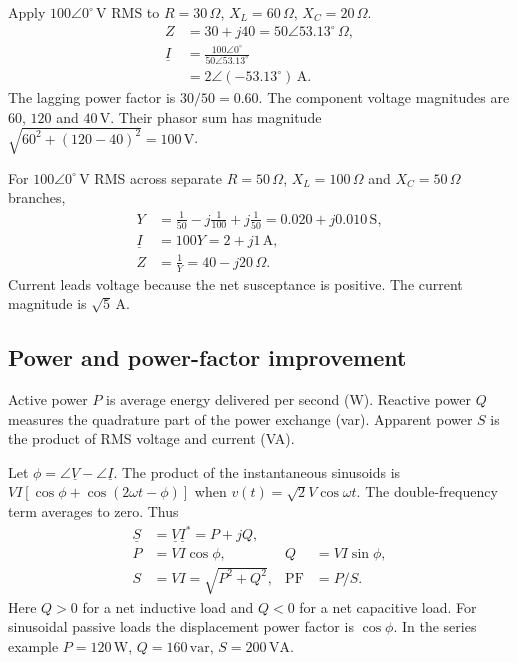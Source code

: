 \documentclass[12pt,a4paper]{article}
\begin{document}
\begin{tcolorbox}[examplebox,title={Solving a series RLC circuit}]
Apply \(100\angle0^\circ\,\mathrm V\) RMS to \(R=30\,\Omega\), \(X_L=60\,\Omega\), \(X_C=20\,\Omega\).
\[
\begin{aligned}
Z&=30+j40=50\angle53.13^\circ\,\Omega,\\
\underline I&=\frac{100\angle0^\circ}{50\angle53.13^\circ}\\
             &=2\angle(-53.13^\circ)\,\mathrm A.
\end{aligned}
\]
The lagging power factor is \(30/50=0.60\). The component voltage magnitudes are \(60\), \(120\) and \(40\,\mathrm V\). Their phasor sum has magnitude \(\sqrt{60^2+(120-40)^2}=100\,\mathrm V\).
\end{tcolorbox}

\begin{tcolorbox}[examplebox,title={Find the input of a parallel RLC circuit}]
For \(100\angle0^\circ\,\mathrm V\) RMS across separate \(R=50\,\Omega\), \(X_L=100\,\Omega\) and \(X_C=50\,\Omega\) branches,
\[
\begin{aligned}
Y&=\frac{1}{50}-j\frac{1}{100}+j\frac{1}{50}
  =0.020+j0.010\,\mathrm S,\\
\underline I&=100Y=2+j1\,\mathrm A,\\
Z&=\frac{1}{Y}=40-j20\,\Omega.
\end{aligned}
\]
Current leads voltage because the net susceptance is positive. The current magnitude is \(\sqrt5\,\mathrm A\).
\end{tcolorbox}

\subsection{Power and power-factor improvement}
\begin{tcolorbox}[defbox,title={Active, reactive and apparent power}]
Active power \(P\) is average energy delivered per second (W). Reactive power \(Q\) measures the quadrature part of the power exchange (var). Apparent power \(S\) is the product of RMS voltage and current (VA).
\end{tcolorbox}

Let \(\phi=\angle\underline V-\angle\underline I\). The product of the instantaneous sinusoids is \(VI[\cos\phi+\cos(2\omega t-\phi)]\) when \(v(t)=\sqrt2V\cos\omega t\). The double-frequency term averages to zero. Thus
\[
\begin{aligned}
\underline S&=\underline V\underline I^*=P+jQ,\\
P&=VI\cos\phi,& Q&=VI\sin\phi,\\
S&=VI=\sqrt{P^2+Q^2},& \mathrm{PF}&=P/S.
\end{aligned}
\]
Here \(Q>0\) for a net inductive load and \(Q<0\) for a net capacitive load. For sinusoidal passive loads the displacement power factor is \(\cos\phi\). In the series example \(P=120\,\mathrm W\), \(Q=160\,\mathrm{var}\), \(S=200\,\mathrm{VA}\).
\end{document}
